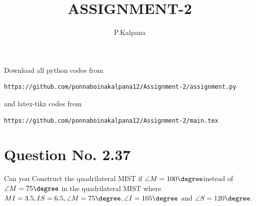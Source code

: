 \documentclass[journal,12pt,twocolumn]{IEEEtran}
\begin{document}
     \def\centbox#1{\makebox[0in]{#1}}
     \def\topbox#1{\raisebox{-\baselineskip}[0in][0in]{#1}}
     \def\midbox#1{\raisebox{-0.5\baselineskip}[0in][0in]{#1}}
\vspace{3cm}
\title{ASSIGNMENT-2}
\author{P.Kalpana}
\maketitle
\newpage
\bigskip
\renewcommand{\thefigure}{\theenumi}
\renewcommand{\thetable}{\theenumi}
Download all python codes from 
\begin{lstlisting}
https://github.com/ponnaboinakalpana12/Assignment-2/assignment.py
\end{lstlisting}
%
and latex-tikz codes from 
%
\begin{lstlisting}
https://github.com/ponnaboinakalpana12/Assignment-2/main.tex
\end{lstlisting}
%
\section{Question No. 2.37}
Can you Construct the quadrilateral MIST if $\angle M=100\degree $instead of$ \angle M =75\degree$ in the quadrilateral MIST where  $MI = 3.5, IS = 6.5, \angle M = 75 \degree, \angle I = 105 \degree$ and $\angle S = 120 \degree$.
%
\end{document}
